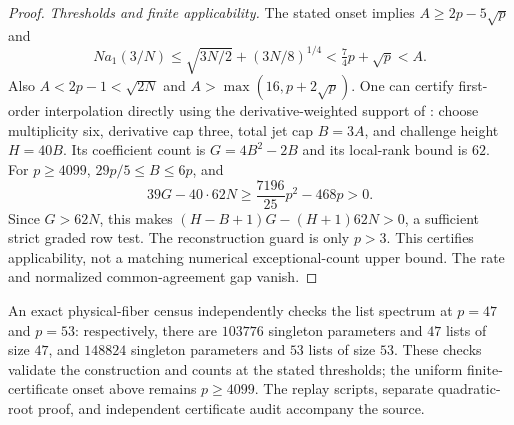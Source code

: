 \begin{proof}
\emph{Thresholds and finite applicability.}
The stated onset implies $A\ge2p-5\sqrt p$ and
\[
 N a_1(3/N)\le\sqrt{3N/2}+(3N/8)^{1/4}
 <\tfrac74p+\sqrt p<A.
\]
Also $A<2p-1<\sqrt{2N}$ and $A>\max(16,p+2\sqrt p)$.
One can certify first-order interpolation directly using the
derivative-weighted support of \cite[Proposition~5.10]{dkt2026}:
choose multiplicity six, derivative cap three, total jet cap $B=3A$,
and challenge height $H=40B$. Its coefficient count is $G=4B^2-2B$
and its local-rank bound is $62$. For $p\ge4099$,
$29p/5\le B\le6p$, and
\[
 39G-40\cdot62N\ge\frac{7196}{25}p^2-468p>0.
\]
Since $G>62N$, this makes
$(H-B+1)G-(H+1)62N>0$, a sufficient strict graded row test.
The reconstruction guard is only $p>3$.
This certifies applicability, not a matching numerical exceptional-count
upper bound. The rate and normalized common-agreement gap vanish.
\end{proof}

An exact physical-fiber census independently checks the list spectrum
at $p=47$ and $p=53$: respectively, there are $103776$ singleton
parameters and $47$ lists of size $47$, and $148824$ singleton
parameters and $53$ lists of size $53$.
These checks validate the construction and counts at the stated
thresholds; the uniform finite-certificate onset above remains $p\ge4099$.
The replay scripts, separate quadratic-root proof, and independent
certificate audit accompany the source.
